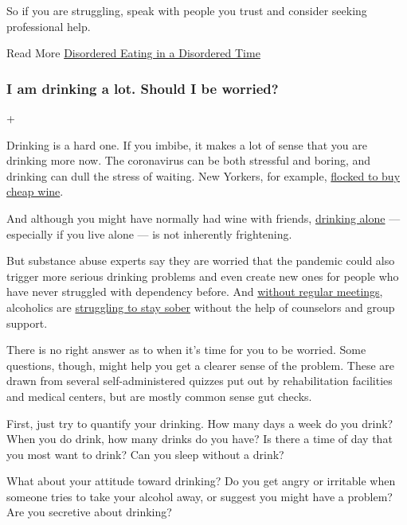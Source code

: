So if you are struggling, speak with people you trust and consider
seeking professional help.

 Read More
\href{https://www.nytimes3xbfgragh.onion/2020/06/05/health/eating-disorders-coronavirus.html}{Disordered
Eating in a Disordered Time}

\hypertarget{i-am-drinking-a-lot-should-i-be-worried}{%
\subsubsection{I am drinking a lot. Should I be
worried?}\label{i-am-drinking-a-lot-should-i-be-worried}}

+

Drinking is a hard one. If you imbibe, it makes a lot of sense that you
are drinking more now. The coronavirus can be both stressful and boring,
and drinking can dull the stress of waiting. New Yorkers, for example,
\href{https://www.nytimes3xbfgragh.onion/2020/04/23/nyregion/coronavirus-liquor-stores-nyc.html}{flocked
to buy cheap wine}.

And although you might have normally had wine with friends,
\href{https://www.nytimes3xbfgragh.onion/2020/03/16/dining/drinks/drinking-alone.html}{drinking
alone} --- especially if you live alone --- is not inherently
frightening.

But substance abuse experts say they are worried that the pandemic could
also trigger more serious drinking problems and even create new ones for
people who have never struggled with dependency before. And
\href{https://www.nytimes3xbfgragh.onion/2020/04/02/nyregion/coronavirus-alcoholics-anonymous-online.html}{without
regular meetings}, alcoholics are
\href{https://www.nytimes3xbfgragh.onion/2020/03/26/health/coronavirus-alcoholics-drugs-online.html}{struggling
to stay sober} without the help of counselors and group support.

There is no right answer as to when it's time for you to be worried.
Some questions, though, might help you get a clearer sense of the
problem. These are drawn from several self-administered quizzes put out
by rehabilitation facilities and medical centers, but are mostly common
sense gut checks.

First, just try to quantify your drinking. How many days a week do you
drink? When you do drink, how many drinks do you have? Is there a time
of day that you most want to drink? Can you sleep without a drink?

What about your attitude toward drinking? Do you get angry or irritable
when someone tries to take your alcohol away, or suggest you might have
a problem? Are you secretive about drinking?

